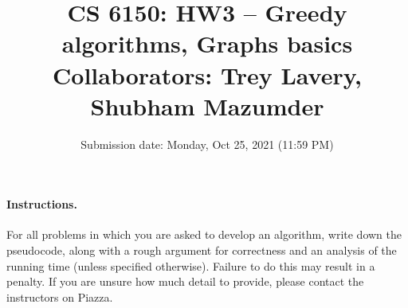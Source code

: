 \documentclass[addpoints, 11pt]{exam}
\title{CS 6150: HW3 -- Greedy algorithms, Graphs basics \\Collaborators: Trey Lavery, Shubham Mazumder}
\date{Submission date: Monday, Oct 25, 2021 (11:59 PM)}
\begin{document}
\maketitle
\begin{center}
\end{center}

\pointname{}
\bonuspointname{}
\pointformat{[\bfseries\thepoints]}

\begin{center}
  \gradetable
\end{center}
\newpage
\paragraph{Instructions.}  For all problems in which you are asked to develop an algorithm, write down the pseudocode, along with a rough argument for correctness and an analysis of the running time (unless specified otherwise). Failure to do this may result in a penalty. If you are unsure how much detail to provide, please contact the instructors on Piazza.
\end{document}
